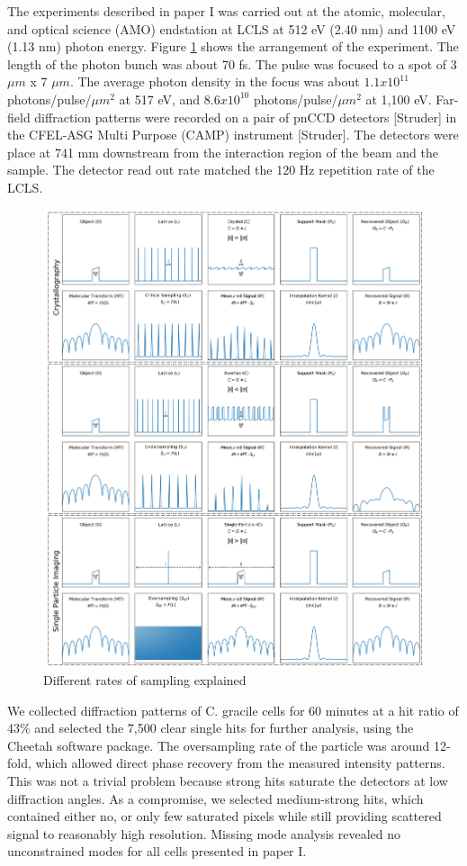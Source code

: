 The experiments described in paper I was carried out at the atomic, molecular, and optical science (AMO) endstation at LCLS at 512 eV (2.40 nm) and 1100 eV (1.13 nm) photon energy.  Figure \ref{fig:ExperimentalSetup} shows the arrangement of the experiment. The length of the photon bunch was about 70 fs. The pulse was focused to a spot of 3 $\mu m$ x 7 $\mu m$. The average photon density in the focus was about $1.1 x 10^{11}$ photons/pulse/$\mu m^2$ at 517 eV, and $8.6 x 10^{10}$ photons/pulse/$\mu m^2$ at 1,100 eV. Far-field diffraction patterns were recorded on a pair of pnCCD detectors [Struder] in the CFEL-ASG Multi Purpose (CAMP) instrument [Struder]. The detectors were place at 741 mm downstream from the interaction region of the beam and the sample. The detector read out rate matched the 120 Hz repetition rate of the LCLS. 
\begin{figure}[h]\label{fig:ExperimentalSetup}
\centering 
\includegraphics[width=120mm]{SamplingTheory.png}
\caption{Different rates of sampling explained}
\end{figure} 

We collected diffraction patterns of C. gracile cells for 60 minutes at a hit ratio of 43\% and selected the 7,500 clear single hits for further analysis, using the Cheetah software package. The oversampling rate of the particle was around 12-fold, which allowed direct phase recovery from the measured intensity patterns. This was not a trivial problem because strong hits saturate the detectors at low diffraction angles. As a compromise, we selected medium-strong hits, which contained either no, or only few saturated pixels while still providing scattered signal to reasonably high resolution. Missing mode analysis revealed no unconstrained modes for all cells presented in paper I. 

